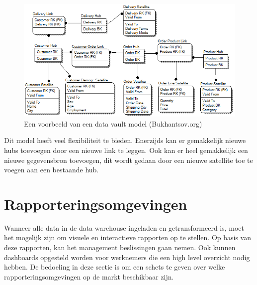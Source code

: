 \begin{figure}[h]
	\centering
	\includegraphics[scale=0.7]{../images/dvmodel.png}
	\caption{Een voorbeeld van een data vault model (Bukhantsov.org)}
	\label{fig:dvmod}
\end{figure}

Dit model heeft veel flexibiliteit te bieden. Enerzijds kan er gemakkelijk nieuwe hubs toevoegen door een nieuwe link te leggen. Ook kan er heel gemakkelijk een nieuwe gegevensbron toevoegen, dit wordt gedaan door een nieuwe satellite toe te voegen aan een bestaande hub. 

\section{Rapporteringsomgevingen}
\label{sec:omgeving}
Wanneer alle data in de data warehouse ingeladen en getransformeerd is, moet het mogelijk zijn om visuele en interactieve rapporten op te stellen. Op basis van deze rapporten, kan het management beslissingen gaan nemen. Ook kunnen dashboards opgesteld worden voor werknemers die een high level overzicht nodig hebben. De bedoeling in deze sectie is om een schets te geven over welke rapporteringsomgevingen op de markt beschikbaar zijn. 

